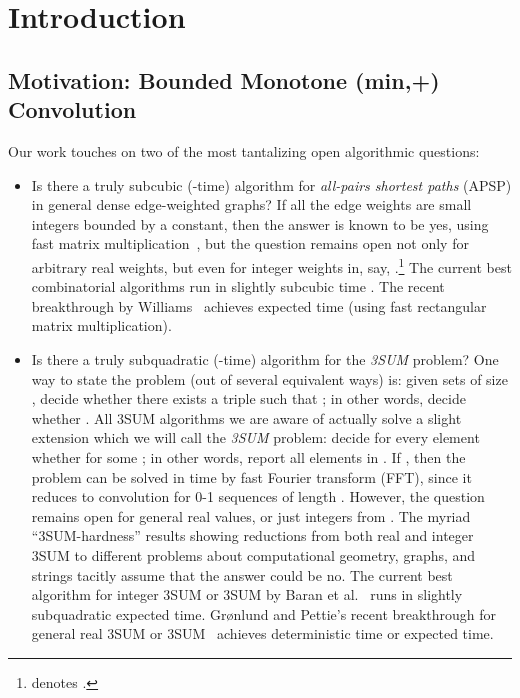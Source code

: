\documentclass[11pt]{article}
\begin{document}
\newpage

\section{Introduction}

\subsection{Motivation: Bounded Monotone (min,+) Convolution}

Our work touches on two of the most tantalizing open algorithmic
questions:
\begin{itemize}
\item Is there a truly subcubic (-time) algorithm
for \emph{all-pairs shortest paths} (APSP) in general dense edge-weighted
graphs?  If all the edge weights are small integers bounded
by a constant, then the
answer is known to be yes, using fast matrix multiplication~\cite{ZwickSURVEY},
but the question remains open not only for arbitrary real weights,
but even for integer weights in, say, .\footnote{ denotes .}
The current best combinatorial algorithms run
in slightly subcubic  time \cite{Chan10,HanTak}.  The recent breakthrough by
Williams~\cite{Williams14} achieves
 expected time (using
fast rectangular matrix multiplication).
\item Is there a truly subquadratic (-time) algorithm for the
\emph{3SUM} problem?  One way to state the problem (out of
several equivalent ways) is:
given sets  of size , decide whether
there exists a triple  such that ; in other words, decide whether
.
All 3SUM algorithms we are aware of actually solve
a slight extension which we will call
the \emph{3SUM} problem:
decide for every element  whether
 for some ; in other words,
report all elements in .
If , then the problem can
be solved in  time by fast Fourier transform (FFT),
since it reduces to convolution for 0-1 sequences of length .
However, the question remains open
for general real values, or just integers from .
The myriad ``3SUM-hardness'' results showing reductions
from both real and integer 3SUM to different problems
about computational geometry, graphs, and strings
\cite{GO95,Patrascu10,BDP08,PW10,VW09,AWW14,ACLL14,JV13,KPP14} tacitly
assume that the answer could be no.
The current best algorithm for integer 3SUM or 3SUM by
Baran et al.~\cite{BDP08} runs in slightly subquadratic
 expected time.
Gr\o nlund and Pettie's recent breakthrough for
general real 3SUM or 3SUM~\cite{GP14} achieves
 deterministic
time or  expected time.
\end{itemize}
\end{document}
